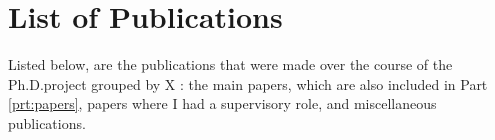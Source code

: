 \chapter{List of Publications}
Listed below, are the publications that were made over the course of the Ph.D.project grouped by X : the main papers, which are also included in Part \ref{prt:papers}, papers where I had a supervisory role, and miscellaneous  publications.
{
\makeatletter
\renewenvironment{thebibliography}[1]
     {\subsubsection*{\bibname}%
      \@mkboth{\MakeUppercase\bibname}{\MakeUppercase\bibname}%
      \list{\@biblabel{\@arabic\c@enumiv}}%
           {\settowidth\labelwidth{\@biblabel{#1}}%
            \leftmargin\labelwidth
            \advance\leftmargin\labelsep
            \@openbib@code
            \usecounter{enumiv}%
            \let\p@enumiv\@empty
            \renewcommand\theenumiv{\@arabic\c@enumiv}}%
      \sloppy
      \clubpenalty4000
      \@clubpenalty \clubpenalty
      \widowpenalty4000%
      \sfcode`\.\@m}
     {\def\@noitemerr
       {\@latex@warning{Empty `thebibliography' environment}}%
      \endlist}
\makeatother





}
